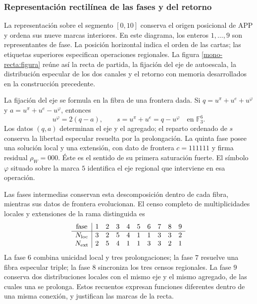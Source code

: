 \subsubsection{Representación rectilínea de las fases y del retorno}
\label{mono-recta:desarrollo}

La representación sobre el segmento \([0,10]\) conserva el origen
posicional de APP y ordena sus nueve marcas interiores. En este diagrama,
los enteros \(1,\ldots,9\) son representantes de fase. La posición
horizontal indica el orden de las cartas; las etiquetas superiores
especifican operaciones regionales. La figura
\ref{mono-recta:figura} reúne así la recta de partida, la fijación del
eje de autoescala, la distribución especular de los dos canales y el
retorno con memoria desarrollados en la construcción precedente.



La fijación del eje se formula en la fibra de una frontera dada. Si
\(q=u^\pi+u^e+u^\varphi\) y
\(a=u^\pi+u^e-u^\varphi\), entonces
\[
 u^\varphi=2(q-a),\qquad s=u^\pi+u^e=q-u^\varphi
 \quad\text{en }\mathbb F_3^6.
\]
Los datos \((q,a)\) determinan el eje y el agregado; el reparto ordenado
de \(s\) conserva la libertad especular resuelta por la prolongación.
La quinta fase posee una solución local y una extensión, con dato
de frontera \(c=111111\) y firma residual \(\rho_W=000\). Éste es el
sentido de su primera saturación fuerte. El símbolo \(\varphi\)
situado sobre la marca \(5\) identifica el eje regional que interviene
en esa operación.

Las fases intermedias conservan esta descomposición dentro de cada fibra,
mientras sus datos de frontera evolucionan. El censo completo de
multiplicidades locales y extensiones de la rama distinguida es
\[
\begin{array}{c|rrrrrrrrr}
\text{fase}&1&2&3&4&5&6&7&8&9\\\hline
N_{\rm loc}&3&2&5&4&1&1&3&3&2\\
N_{\rm ext}&2&5&4&1&1&3&3&2&1
\end{array}
\]
La fase \(6\) combina unicidad local y tres prolongaciones; la fase
\(7\) resuelve una fibra especular triple; la fase \(8\) sincroniza
los tres censos regionales. La fase \(9\) conserva dos distribuciones
locales con el mismo eje y el mismo agregado, de las cuales una se
prolonga. Estos recuentos expresan funciones diferentes dentro de una
misma conexión, y justifican las marcas de la recta.

